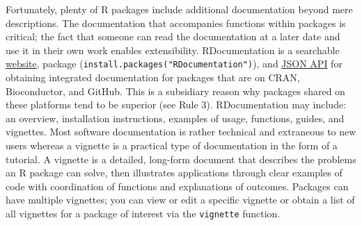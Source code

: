 \documentclass[10pt,letterpaper]{article}
\begin{document}
Fortunately, plenty of R packages include additional documentation
beyond mere descriptions. The documentation that accompanies functions
within packages is critical; the fact that someone can read the
documentation at a later date and use it in their own work enables
extensibility. RDocumentation is a searchable
\href{https://www.rdocumentation.org/}{website}, package
(\texttt{install.packages("RDocumentation")}), and
\href{https://www.rdocumentation.org/docs/}{JSON API} for obtaining
integrated documentation for packages that are on CRAN, Bioconductor,
and GitHub. This is a subsidiary reason why packages shared on these
platforms tend to be superior (see Rule 3). RDocumentation may include:
an overview, installation instructions, examples of usage, functions,
guides, and vignettes. Most software documentation is rather technical
and extraneous to new users whereas a vignette is a practical type of
documentation in the form of a tutorial. A vignette is a detailed,
long-form document that describes the problems an R package can solve,
then illustrates applications through clear examples of code with
coordination of functions and explanations of outcomes. Packages can
have multiple vignettes; you can view or edit a specific vignette or
obtain a list of all vignettes for a package of interest via the
\texttt{vignette} function.
\end{document}
